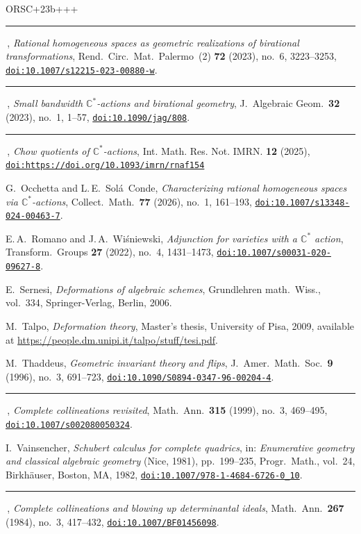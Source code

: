 \documentclass[10pt,a4paper]{article}
\numberwithin{equation}{section}
\theoremstyle{definition}
\theoremstyle{remark}
\providecommand{\etalchar}[1]{#1}
\providecommand{\bysame}{\rule[.5ex]{3em}{.3pt}\,}
\providecommand{\doi}[2][]{\href{https://doi.org/#2}{\nolinkurl{doi:#2}}}
\begin{document}
\begin{thebibliography}{ORSC\etalchar{+}23b+++}
\bysame, 
\emph{Rational homogeneous spaces as geometric realizations of birational
  transformations}, 
Rend.\ Circ.\ Mat.\ Palermo~(2) \textbf{72} (2023), no.~6, 3223--3253, 
\doi{10.1007/s12215-023-00880-w}.

\bysame, 
\emph{Small bandwidth {$\mathbb C^*$}-actions and birational geometry}, 
J.~Algebraic Geom.\ \textbf{32} (2023), no.~1, 1--57,
\doi{10.1090/jag/808}.

\bysame, 
\emph{Chow quotients of $\mathbb{C}^*$-actions}, 
Int. Math. Res. Not. IMRN. \textbf{12} (2025), 
\doi{https://doi.org/10.1093/imrn/rnaf154}

G.~Occhetta and L.\,E.~Sol{\'a}~Conde, 
\emph{Characterizing rational homogeneous spaces via {$\mathbb
  C^*$}-actions}, 
Collect.\ Math.\ \textbf{77} (2026), no.~1, 161--193,
\doi{10.1007/s13348-024-00463-7}.

E.\,A.~Romano and J.\,A.~Wi\'{s}niewski, 
\emph{Adjunction for varieties with a {$\mathbb{C}^*$} action}, 
Transform.\ Groups \textbf{27} (2022), no.~4, 1431--1473,
\doi{10.1007/s00031-020-09627-8}.

E.~Sernesi, 
\emph{Deformations of algebraic schemes},
Grundlehren math.\ Wiss.,  vol.~334, 
Springer-Verlag, Berlin, 2006.

M.~Talpo, 
\emph{Deformation theory}, 
Master's thesis, University of Pisa, 2009, available at \url{https://people.dm.unipi.it/talpo/stuff/tesi.pdf}.

M.~Thaddeus, 
\emph{Geometric invariant theory and flips}, 
J.~Amer.\ Math.\ Soc.\ \textbf{9} (1996), no.~3, 691--723,
\doi{10.1090/S0894-0347-96-00204-4}.

\bysame, 
\emph{Complete collineations revisited}, 
Math.\ Ann.\ \textbf{315} (1999), no.~3, 469--495,
\doi{10.1007/s002080050324}.

I.~Vainsencher, 
\emph{Schubert calculus for complete quadrics}, 
in: \emph{Enumerative geometry and classical algebraic geometry}
  ({N}ice, 1981),  pp.~199--235, Progr.\ Math., vol.~24, 
Birkh\"auser, Boston, MA, 1982,
\doi{10.1007/978-1-4684-6726-0_10}.

  \bysame,
  \emph{Complete collineations and blowing up determinantal ideals}, 
  Math.\ Ann.\ \textbf{267} (1984), no.~3, 417--432,
  \doi{10.1007/BF01456098}.

\end{thebibliography}
\end{document}
